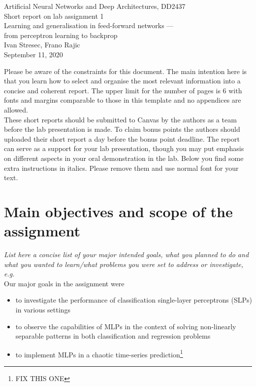 \documentclass[a4paper]{article}
\begin{document}
\begin{center}
  {\large Artificial Neural Networks and Deep Architectures, DD2437}\\
  \vspace{7mm}
  {\huge Short report on lab assignment 1\\[1ex]}
  {\Large Learning and generalisation in feed-forward networks ---\\[1ex]
 from perceptron learning to backprop}\\
  \vspace{8mm}  
  {\Large Ivan Stresec, Frano Rajic\\}
  \vspace{4mm}
  {\large September 11, 2020\\}
\end{center}

\begin{framed}
Please be aware of the constraints for this document. The main intention here is that you learn how to select and organise the most relevant information into a concise and coherent report. The upper limit for the number of pages is 6 with fonts and margins comparable to those in this template and no appendices are allowed. \\
These short reports should be submitted to Canvas by the authors as a team before the lab presentation is made. To claim bonus points the authors should uploaded their short report a day before the bonus point deadline. The report can serve as a support for your lab presentation, though you may put emphasis on different aspects in your oral demonstration in the lab.
Below you find some extra instructions in italics. Please remove them and use normal font for your text.
\end{framed}

\section{Main objectives and scope of the assignment}

\textit{List here a concise list of your major intended goals, what you planned to do and what you wanted to learn/what problems you were set to address or investigate, e.g.}\\
Our major goals in the assignment were  
\begin{itemize}
\item to investigate the performance of classification single-layer perceptrons (SLPs) in various settings
\item to observe the capabilities of MLPs in the context of solving non-linearly separable patterns in both classification and regression problems 
\item to implement MLPs in a chaotic time-series prediction\footnote{FIX THIS ONE}
\end{itemize}
\end{document}
